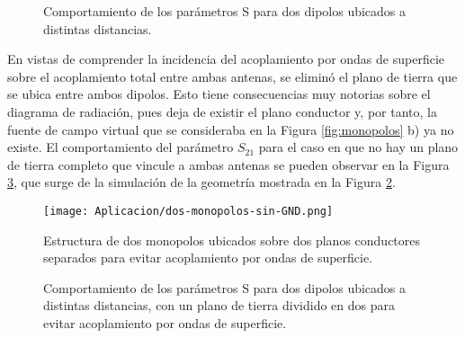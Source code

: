 \begin{figure}[H]
	\centering 
	\hspace{0pt}
	\caption{Comportamiento de los parámetros S para dos dipolos ubicados a distintas distancias.}
	\label{fig:dipolos-distancia-resultados}	
\end{figure}  

En vistas de comprender la incidencia del acoplamiento por ondas de superficie sobre el acoplamiento total entre ambas antenas, se eliminó el plano de tierra que se ubica entre ambos dipolos. Esto tiene consecuencias muy notorias sobre el diagrama de radiación, pues deja de existir el plano conductor y, por tanto, la fuente de campo virtual que se consideraba en la Figura \ref{fig:monopolos} b) ya no existe. El comportamiento del parámetro $S_{21}$ para el caso en que no hay un plano de tierra completo que vincule a ambas antenas se pueden observar en la Figura \ref{fig:monopolos-sin-plano-de-tierra-resultados}, que surge de la simulación de la geometría mostrada en la Figura \ref{fig:monopolos-sin-plano-de-tierra-geometria}. 


\begin{figure}[H]
	\centering
	\texttt{[image: Aplicacion/dos-monopolos-sin-GND.png]}
	\caption{Estructura de dos monopolos ubicados sobre dos planos conductores separados para evitar acoplamiento por ondas de superficie.}
	\label{fig:monopolos-sin-plano-de-tierra-geometria}
\end{figure}

\begin{figure}[H]
	\centering 
	\hspace{0pt}
	\caption{Comportamiento de los parámetros S para dos dipolos ubicados a distintas distancias, con un plano de tierra dividido en dos para evitar acoplamiento por ondas de superficie.}
	\label{fig:monopolos-sin-plano-de-tierra-resultados}	
\end{figure}  

